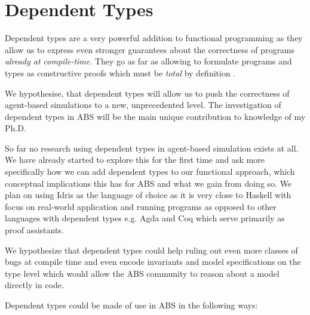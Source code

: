\chapter{Dependent Types}
\label{chap:dependent_types}
Dependent types are a very powerful addition to functional programming as they allow us to express even stronger guarantees about the correctness of programs \textit{already at compile-time}. They go as far as allowing to formulate programs and types as constructive proofs which must be \textit{total} by definition \cite{thompson_type_1991, mckinna_why_2006, altenkirch_pi_2010}. 

We hypothesise, that  dependent types will allow us to push the correctness of agent-based simulations to a new, unprecedented level. The investigation of dependent types in ABS will be the main unique contribution to knowledge of my Ph.D.

So far no research using dependent types in agent-based simulation exists at all. We have already started to explore this for the first time and ask more specifically how we can add dependent types to our functional approach, which conceptual implications this has for ABS and what we gain from doing so. We plan on using Idris \cite{brady_idris_2013} as the language of choice as it is very close to Haskell with focus on real-world application and running programs as opposed to other languages with dependent types e.g. Agda and Coq which serve primarily as proof assistants.

We hypothesize that dependent types could help ruling out even more classes of bugs at compile time and even encode invariants and model specifications on the type level which would allow the ABS community to reason about a model directly in code. 

Dependent types could be made of use in ABS in the following ways:

